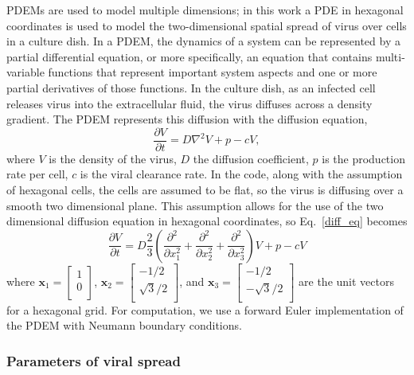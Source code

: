PDEMs are used to model multiple dimensions; in this work a PDE in hexagonal coordinates is used to model the two-dimensional spatial spread of virus over cells in a culture dish. In a PDEM, the dynamics of a system can be represented by a partial differential equation, or more specifically, an equation that contains multi-variable functions that represent important system aspects and one or more partial derivatives of those functions. In the culture dish, as an infected cell releases virus into the extracellular fluid, the virus diffuses across a density gradient. The PDEM represents this diffusion with the diffusion equation, 
\begin{equation}
\frac{\partial V}{\partial t}=D \nabla^{2}V + p - cV, \label{diff_eq}
\end{equation}
where $V$ is the density of the virus, $D$ the diffusion coefficient, $p$ is the production rate per cell, $c$ is the viral clearance rate. In the code, along with the assumption of hexagonal cells, the cells are assumed to be flat, so the virus is diffusing over a smooth two dimensional plane. This assumption allows for the use of the two dimensional diffusion equation in hexagonal coordinates, so Eq.\ \eqref{diff_eq} becomes 
$$\frac{\partial V}{\partial t} = D\frac{2}{3} \left (\frac{\partial^2}{\partial x^2_1}+\frac{\partial^2}{\partial x^2_2}+\frac{\partial^2}{\partial x^2_3}\right )V + p -cV$$ 
where  
$\textbf{x}_1=
\left [
    \begin{array}{c}
        1 \\
        0 \\
    \end{array}
\right ]$, 
$\textbf{x}_2=
\left [
    \begin{array}{c}
        -1/2 \\
        \sqrt{3}/2 \\
    \end{array}
\right ]$, and 
$\textbf{x}_3=
\left [
    \begin{array}{c}
        -1/2 \\
        -\sqrt{3}/2 \\
    \end{array}
\right ]$ 
are the unit vectors for a hexagonal grid. For computation, we use a forward Euler implementation of the PDEM with Neumann boundary conditions.

\subsubsection{Parameters of viral spread}

